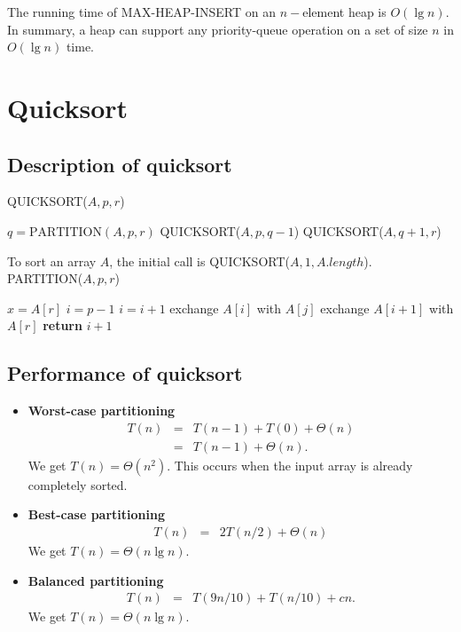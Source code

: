 \documentclass[12pt]{article}
\begin{document}
The running time of MAX-HEAP-INSERT on an $n-$element heap is $O(\lg n)$. \\

In summary, a heap can support any priority-queue operation on a set of size $n$ in $O(\lg n)$ time.

\section{Quicksort}

\subsection{Description of quicksort}

QUICKSORT($A, p, r$)
\begin{algorithmic}[1]
	\State $q = \text {PARTITION}(A, p, r)$
        \State QUICKSORT($A, p, q-1$)
        \State QUICKSORT($A, q+1, r$)
\EndIf
\end{algorithmic}

To sort an array $A$, the initial call is QUICKSORT($A, 1, A.length$). \\

PARTITION($A, p, r$)
\begin{algorithmic}[1]
\State $x = A[r]$
\State $i = p - 1$
        	\State $i = i + 1$
                \State exchange $A[i]$ with $A[j]$
        \EndIf
\EndFor
\State exchange $A[i+1]$ with $A[r]$
\State \textbf{return } $i+1$
\end{algorithmic}

\subsection{Performance of quicksort}

\begin{itemize}
  \item \textbf{Worst-case partitioning}
    \begin{eqnarray*}
      T(n)
      &=& T(n-1) + T(0) + \Theta(n) \\
      &=& T(n-1) + \Theta(n).
    \end{eqnarray*}
    We get $T(n) = \Theta (n^2)$. This occurs when the input array is already completely sorted.
  \item \textbf {Best-case partitioning}
    \begin{eqnarray*}
      T(n)
      &=& 2T(n/2) + \Theta(n)
    \end{eqnarray*}
    We get $T(n) = \Theta (n \lg n)$.
  \item \textbf {Balanced partitioning}
    \begin{eqnarray*}
      T(n)
      &=& T(9n/10) + T(n/10) + cn.
    \end{eqnarray*}    
    We get $T(n) = \Theta (n \lg n)$.
\end{itemize}
\end{document}
